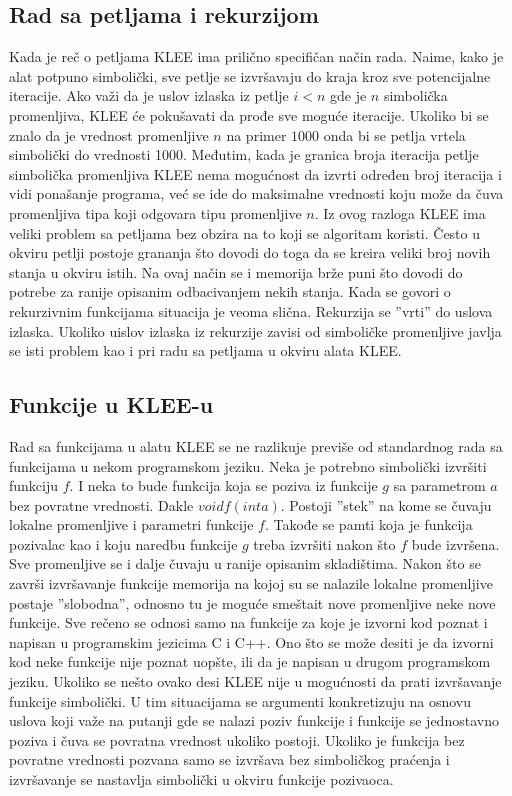\documentclass[12pt]{article}
\begin{document}
\subsection{Rad sa petljama i rekurzijom}
Kada je reč o petljama KLEE ima prilično specifičan način rada. Naime, kako je alat potpuno simbolički, sve petlje se izvršavaju do kraja kroz sve potencijalne iteracije. Ako važi da je uslov izlaska iz petlje $i < n$ gde je $n$ simbolička promenljiva, KLEE će pokušavati da prođe sve moguće iteracije. Ukoliko bi se znalo da je vrednost promenljive $n$ na primer $1000$ onda bi se petlja vrtela simbolički do vrednosti 1000. Međutim, kada je granica broja iteracija petlje simbolička promenljiva KLEE nema mogućnost da izvrti određen broj iteracija i vidi ponašanje programa, već se ide do maksimalne vrednosti koju može da čuva promenljiva tipa koji odgovara tipu promenljive $n$. Iz ovog razloga KLEE ima veliki problem sa petljama bez obzira na to koji se algoritam koristi. Često u okviru petlji postoje grananja što dovodi do toga da se kreira veliki broj novih stanja u okviru istih. Na ovaj način se i memorija brže puni što dovodi do potrebe za ranije opisanim odbacivanjem nekih stanja. Kada se govori o rekurzivnim funkcijama situacija je veoma slična. Rekurzija se ''vrti'' do uslova izlaska. Ukoliko uislov izlaska iz rekurzije zavisi od simboličke promenljive javlja se isti problem kao i pri radu sa petljama u okviru alata KLEE.

\subsection{Funkcije u KLEE-u}
Rad sa funkcijama u alatu KLEE se ne razlikuje previše od standardnog rada sa funkcijama u nekom programskom jeziku. Neka je potrebno simbolički izvršiti funkciju $f$. I neka to bude funkcija koja se poziva iz funkcije $g$ sa parametrom $a$ bez povratne vrednosti. Dakle $void f(int a)$. Postoji ''stek'' na kome se čuvaju lokalne promenljive i parametri funkcije $f$. Takođe se pamti koja je funkcija pozivalac kao i koju naredbu funkcije $g$ treba izvršiti nakon što $f$ bude izvršena. Sve promenljive se i dalje čuvaju u ranije opisanim skladištima. Nakon što se završi izvršavanje funkcije memorija na kojoj su se nalazile lokalne promenljive postaje ''slobodna'', odnosno tu je moguće smeštait nove promenljive neke nove funkcije. Sve rečeno se odnosi samo na funkcije za koje je izvorni kod poznat i napisan u programskim jezicima C i C++. Ono što se može desiti je da izvorni kod neke funkcije nije poznat uopšte, ili da je napisan u drugom programskom jeziku. Ukoliko se nešto ovako desi KLEE nije u mogućnosti da prati izvršavanje funkcije simbolički. U tim situacijama se argumenti konkretizuju na osnovu uslova koji važe na putanji gde se nalazi poziv funkcije i funkcije se jednostavno poziva i čuva se povratna vrednost ukoliko postoji. Ukoliko je funkcija bez povratne vrednosti pozvana samo se izvršava bez simboličkog praćenja i izvršavanje se nastavlja simbolički u okviru funkcije pozivaoca. 
\end{document}
